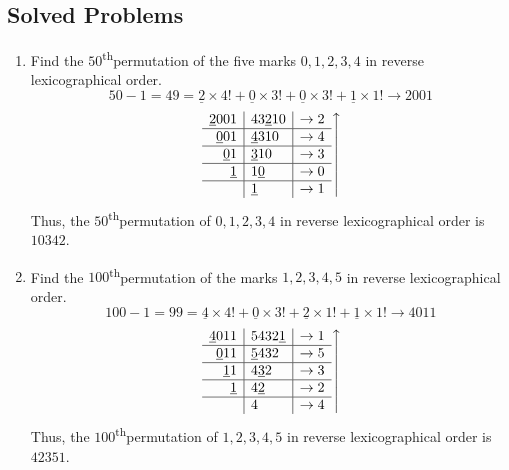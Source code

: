 \documentclass[svgnames]{article}
\renewcommand{\th}{\textsuperscript{th}}
\begin{document}
\subsection*{Solved Problems}
\begin{enumerate}
\item Find the $50$\th permutation of the five marks $0, 1, 2, 3, 4$ in reverse lexicographical order.
\begin{equation*}
50 - 1 = 49 = \underline 2 \times 4! + \underline 0 \times 3! + \underline 0 \times 3! + \underline 1 \times 1! \to 2001
\end{equation*}
\begin{equation*}
\left.
\begin{array}{r|l|c}
\underline 2001	&	43\underline 210	&	\to 2\\
\hline
\underline 001	&	\underline 4310	&	\to 4\\
\hline
\underline 01	&	\underline 310	&	\to 3\\
\hline
\underline 1	&	1\underline 0	&	\to 0\\
\hline
&	\underline 1	&	\to 1
\end{array}
\right\uparrow
\end{equation*}
Thus, the $50$\th permutation of $0, 1, 2, 3, 4$ in reverse lexicographical order is $\boxed{10342}$.

\item Find the $100$\th permutation of the marks $1, 2, 3, 4, 5$ in reverse lexicographical order.
\begin{equation*}
100 - 1 = 99 = \underline 4 \times 4! + \underline 0 \times 3! + \underline 2 \times 1! + \underline 1 \times 1! \to 4011
\end{equation*}
\begin{equation*}
\left.
\begin{array}{r|l|c}
\underline 4011	&	5432\underline 1	&	\to 1\\
\hline
\underline 011	&	\underline 5432	&	\to 5\\
\hline
\underline 11	&	4\underline 32	&	\to 3\\
\hline
\underline 1	&	4\underline 2	&	\to 2\\
\hline
&	4	&	\to 4
\end{array}
\right\uparrow
\end{equation*}
Thus, the $100$\th permutation of $1, 2, 3, 4, 5$ in reverse lexicographical order is $\boxed{42351}$.
\end{enumerate}
\end{document}
